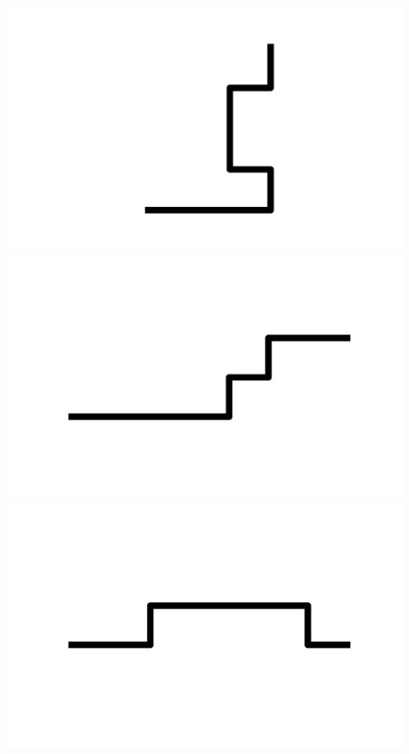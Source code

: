 \documentclass[]{report}
\begin{document}
\includegraphics[scale=.1]{pictures/21/state_cluster_shapes_298.pdf} 
\includegraphics[scale=.1]{pictures/21/state_cluster_shapes_299.pdf} 
\includegraphics[scale=.1]{pictures/21/state_cluster_shapes_300.pdf} 
\end{document}
